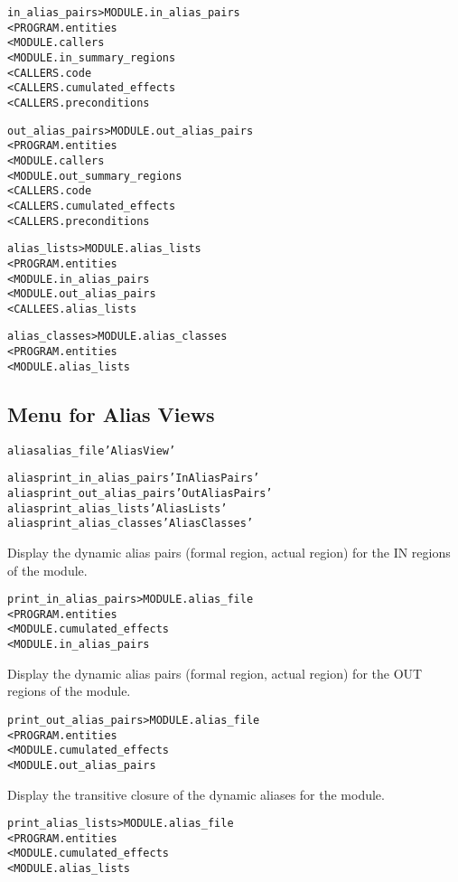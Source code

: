 \documentclass[a4paper]{report}
\newenvironment{PipsMake}{\begin{alltt}}{\end{alltt}}
\begin{document}
\begin{PipsMake}
in_alias_pairs > MODULE.in_alias_pairs
        < PROGRAM.entities
        < MODULE.callers
        < MODULE.in_summary_regions
        < CALLERS.code
        < CALLERS.cumulated_effects
        < CALLERS.preconditions

out_alias_pairs > MODULE.out_alias_pairs
        < PROGRAM.entities
        < MODULE.callers
        < MODULE.out_summary_regions
        < CALLERS.code
        < CALLERS.cumulated_effects
        < CALLERS.preconditions

alias_lists > MODULE.alias_lists
        < PROGRAM.entities
        < MODULE.in_alias_pairs
        < MODULE.out_alias_pairs
        < CALLEES.alias_lists

alias_classes > MODULE.alias_classes
        < PROGRAM.entities
        < MODULE.alias_lists
\end{PipsMake}


\subsection{Menu for Alias Views}

\begin{PipsMake}
alias alias_file 'Alias View'

alias print_in_alias_pairs 'In Alias Pairs'
alias print_out_alias_pairs 'Out Alias Pairs'
alias print_alias_lists 'Alias Lists'
alias print_alias_classes 'Alias Classes'
\end{PipsMake}

Display the dynamic alias pairs (formal region, actual region) for the IN
regions of the module.
\begin{PipsMake}
print_in_alias_pairs > MODULE.alias_file
        < PROGRAM.entities
        < MODULE.cumulated_effects
        < MODULE.in_alias_pairs
\end{PipsMake}

Display the dynamic alias pairs (formal region, actual region) for the OUT
regions of the module.
\begin{PipsMake}
print_out_alias_pairs > MODULE.alias_file
        < PROGRAM.entities
        < MODULE.cumulated_effects
        < MODULE.out_alias_pairs
\end{PipsMake}

Display the transitive closure of the dynamic aliases for the module.
\begin{PipsMake}
print_alias_lists > MODULE.alias_file
        < PROGRAM.entities
        < MODULE.cumulated_effects
        < MODULE.alias_lists
\end{PipsMake}
\end{document}
